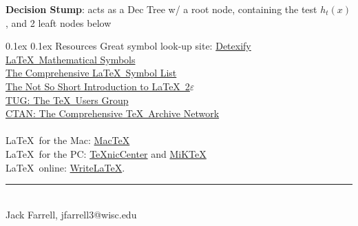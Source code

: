 \documentclass[10pt,landscape]{article}
\makeatletter
\renewcommand{\section}{\@startsection{section}{1}{0mm}%
                                {0.1ex}%
                                {0.1ex}%
                                {\normalfont\normalsize\bfseries}}
\makeatother
\begin{document}
\begin{multicols}{3}
\textbf{Decision Stump}: acts as a Dec Tree w/ a root node, containing the test $h_t(x)$, and 2 leaft nodes below



\newpage

\section{Resources}
Great symbol look-up site: \href{http://detexify.kirelabs.org/}{Detexify}\\
\href{http://amath.colorado.edu/documentation/LaTeX/Symbols.pdf}{\LaTeX\ Mathematical Symbols}\\
\href{ftp://tug.ctan.org/pub/tex-archive/info/symbols/comprehensive/symbols-letter.pdf}{The Comprehensive \LaTeX\ Symbol List}\\ 
\href{http://mirrors.med.harvard.edu/ctan/info/lshort/english/lshort.pdf}{The Not So Short Introduction to \LaTeX\ 2$\varepsilon$}\\
\href{http://www.tug.org/}{TUG: The \TeX\ Users Group}\\
\href{http://www.ctan.org/}{CTAN: The Comprehensive \TeX\ Archive Network}\\
~\\
\LaTeX\ for the Mac: \href{http://www.tug.org/mactex/}{Mac\TeX}\\
\LaTeX\ for the PC: \href{http://www.texniccenter.org/}{{\TeX}nicCenter} and \href{http://miktex.org/}{MiK\TeX}\\
\LaTeX\ online: \href{http://www.writelatex.com/}{WriteLaTeX}.
\vfill
\hrule
~\\
Jack Farrell, jfarrell3@wisc.edu
\end{multicols}
\end{document}
